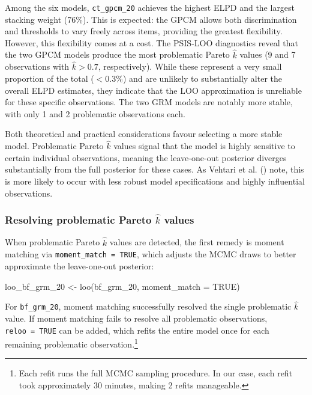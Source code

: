 \documentclass[
  man,
  floatsintext,
  longtable,
  nolmodern,
  notxfonts,
  notimes,
  colorlinks=true,linkcolor=blue,citecolor=blue,urlcolor=blue]{apa7}
\newenvironment{Shaded}{\begin{snugshade}}{\end{snugshade}}
\newcommand{\AttributeTok}[1]{\textcolor[rgb]{0.40,0.45,0.13}{#1}}
\newcommand{\ConstantTok}[1]{\textcolor[rgb]{0.56,0.35,0.01}{#1}}
\newcommand{\FunctionTok}[1]{\textcolor[rgb]{0.28,0.35,0.67}{#1}}
\newcommand{\NormalTok}[1]{\textcolor[rgb]{0.00,0.23,0.31}{#1}}
\newcommand{\OtherTok}[1]{\textcolor[rgb]{0.00,0.23,0.31}{#1}}
\begin{document}
Among the six models, \texttt{ct\_gpcm\_20} achieves the highest ELPD
and the largest stacking weight (76\%). This is expected: the GPCM
allows both discrimination and thresholds to vary freely across items,
providing the greatest flexibility. However, this flexibility comes at a
cost. The PSIS-LOO diagnostics reveal that the two GPCM models produce
the most problematic Pareto \(\hat{k}\) values (9 and 7 observations
with \(\hat{k} > 0.7\), respectively). While these represent a very
small proportion of the total (\(< 0.3\%\)) and are unlikely to
substantially alter the overall ELPD estimates, they indicate that the
LOO approximation is unreliable for these specific observations. The two
GRM models are notably more stable, with only 1 and 2 problematic
observations each.

Both theoretical and practical considerations favour selecting a more
stable model. Problematic Pareto \(\hat{k}\) values signal that the
model is highly sensitive to certain individual observations, meaning
the leave-one-out posterior diverges substantially from the full
posterior for these cases. As Vehtari et al.
() note, this is more likely to
occur with less robust model specifications and highly influential
observations.

\subsubsection{\texorpdfstring{Resolving problematic Pareto \(\hat{k}\)
values}{Resolving problematic Pareto \textbackslash hat\{k\} values}}\label{resolving-problematic-pareto-hatk-values}

When problematic Pareto \(\hat{k}\) values are detected, the first
remedy is moment matching via \texttt{moment\_match\ =\ TRUE}, which
adjusts the MCMC draws to better approximate the leave-one-out
posterior:

\begin{Shaded}
\begin{Highlighting}[]
\NormalTok{loo\_bf\_grm\_20 }\OtherTok{\textless{}{-}} \FunctionTok{loo}\NormalTok{(bf\_grm\_20, }\AttributeTok{moment\_match =} \ConstantTok{TRUE}\NormalTok{)}
\end{Highlighting}
\end{Shaded}

For \texttt{bf\_grm\_20}, moment matching successfully resolved the
single problematic \(\hat{k}\) value. If moment matching fails to
resolve all problematic observations, \texttt{reloo\ =\ TRUE} can be
added, which refits the entire model once for each remaining problematic
observation.\footnote{Each refit runs the full MCMC sampling procedure.
  In our case, each refit took approximately 30 minutes, making 2 refits
  manageable.}
\end{document}
